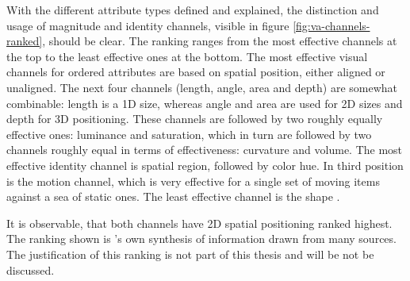 With the different attribute types defined and explained, the distinction and usage of magnitude and identity channels, visible in figure \ref{fig:va-channels-ranked}, should be clear. The ranking ranges from the most effective channels at the top to the least effective ones at the bottom. The most effective visual channels for ordered attributes are based on spatial position, either aligned or unaligned. The next four channels (length, angle, area and depth) are somewhat combinable: length is a 1D size, whereas angle and area are used for 2D sizes and depth for 3D positioning. These channels are followed by two roughly equally effective ones: luminance and saturation, which in turn are followed by two channels roughly equal in terms of effectiveness: curvature and volume. The most effective identity channel is spatial region, followed by color hue. In third position is the motion channel, which is very effective for a single set of moving items against a sea of static ones. The least effective channel is the shape .

It is observable, that both channels have 2D spatial positioning ranked highest. The ranking shown is \citeauthor{Munzner2014}'s own synthesis of information drawn from many sources. The justification of this ranking is not part of this thesis and will be not be discussed.